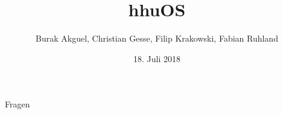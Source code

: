 \documentclass[german,aspectratio=169]{beamer}
\title{hhuOS}
\date{18. Juli 2018}
\author{Burak Akguel, Christian Gesse, Filip Krakowski, Fabian Ruhland}
\institute{Institute of Computer Science \\
	Heinrich-Heine-University Düsseldorf}
\begin{document}
	
	\maketitle
	
	
	
	

	
	
	
	
	\begin{frame}[standout]
			\Large Fragen
	\end{frame}
\end{document}
